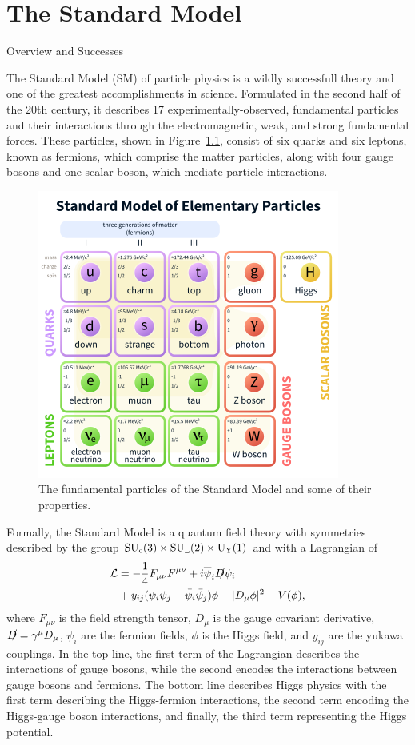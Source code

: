 \chapter{The Standard Model}
\begin{section}{Overview and Successes}

The Standard Model (SM) of particle physics is a wildly successfull theory and one of the greatest accomplishments in science.
Formulated in the second half of the 20th century, it describes 17 experimentally-observed, fundamental particles and their interactions through the electromagnetic, weak, and strong fundamental forces.
These particles, shown in Figure~\ref{fig:sm_particles}, consist of six quarks and six leptons, known as fermions, which comprise the matter particles, along with four gauge bosons and one scalar boson, which mediate particle interactions.

\begin{figure}[tbp!]
\begin{center}
\includegraphics[angle=0,width=0.60\columnwidth]{fig/sm_particles.png}
\end{center}
\caption{The fundamental particles of the Standard Model and some of their properties.}
\label{fig:sm_particles}
\end{figure}

Formally, the Standard Model is a quantum field theory with symmetries described by the group $\mathrm{SU}_{\mathrm{c}}(3) \times \mathrm{SU}_{\mathrm{L}}(2) \times \mathrm{U}_{\mathrm{Y}}(1)$ and with a Lagrangian of
\begin{align}
\mathcal{L} &= -\frac{1}{4}F_{\mu\nu}F^{\mu\nu} + i\overline{\psi}_i\slashed{D}\psi_i \nonumber \\
            &+ y_{ij}(\psi_{i}\psi_{j}+\bar{\psi}_{i}\bar{\psi}_{j})\phi + |D_{\mu}\phi|^2 - V(\phi),
\end{align}
where $F_{\mu\nu}$ is the field strength tensor, $D_{\mu}$ is the gauge covariant derivative, $\slashed{D} = \gamma^{\mu}D_{\mu}$, $\psi_{i}$ are the fermion fields, $\phi$ is the Higgs field, and $y_{ij}$ are the yukawa couplings.
In the top line, the first term of the Lagrangian describes the interactions of gauge bosons, while the second encodes the interactions between gauge bosons and fermions.
The bottom line describes Higgs physics with the first term describing the Higgs-fermion interactions, the second term encoding the Higgs-gauge boson interactions, and finally, the third term representing the Higgs potential.


\end{section}
